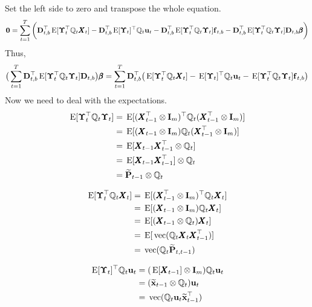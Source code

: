 \documentclass[]{article}
\def\bbeta{\pmb{\beta}}
\def\DD{\mbox{$\mathbf D$}}	\def\dd{\mbox{$\mathbf d$}}
\def\II{\mbox{$\mathbf I$}} \def\ii{\mbox{$\mathbf i$}}
\def\PP{\mbox{$\mathbf P$}}  \def\pp{\mbox{$\mathbf p$}}
\def\XX{\mbox{$\pmb{X}$}}	\def\xx{\mbox{$\pmb{x}$}}
\def\E{\,\textup{\textrm{E}}}
\def\vec{\,\textup{\textrm{vec}}}
\def\hatxtm{\widetilde{\mbox{$\mathbf x$}}_{t-1}}
\def\hatPtm{\widetilde{\PP}_{t-1}}
\def\hatPttm{\widetilde{\PP}_{t,t-1}}
\begin{document}
Set the left side to zero and transpose the whole equation. 
\begin{equation}
\mathbf{0}
 = \sum_{t=1}^T \bigg(
\DD_{t,b}^\top\E[\Bm_t^\top\Qm_t\XX_t]- \DD_{t,b}^\top\E[\Bm_t]^\top\Qm_t\uu_t
 - \DD_{t,b}^\top\E[\Bm_t^\top\Qm_t\Bm_t]\ff_{t,b}
 - \DD_{t,b}^\top\E[\Bm_t^\top\Qm_t\Bm_t]\DD_{t,b}\bbeta \bigg)
\end{equation}
Thus,
\begin{equation}
\big(\sum_{t=1}^T \DD_{t,b}^\top\E[\Bm_t^\top\Qm_t\Bm_t]\DD_{t,b} \big)\bbeta
 = \sum_{t=1}^T \DD_{t,b}^\top\big(
 \E[\Bm_t^\top\Qm_t\XX_t]
 - \E[\Bm_t]^\top\Qm_t\uu_t
  - \E[\Bm_t^\top\Qm_t\Bm_t]\ff_{t,b} \big)
\end{equation}
Now we need to deal with the expectations.
\begin{equation}\label{eq:B.expect1}
\begin{split}
\E[\Bm_t^\top\Qm_t\Bm_t]
&=\E[(\XX_{t-1}^\top \otimes \II_m)^\top\Qm_t(\XX_{t-1}^\top \otimes \II_m)]\\
&=\E[(\XX_{t-1} \otimes \II_m)\Qm_t(\XX_{t-1}^\top \otimes \II_m)]\\
&=\E[\XX_{t-1}\XX_{t-1}^\top \otimes \Qm_t]\\
&=\E[\XX_{t-1}\XX_{t-1}^\top] \otimes \Qm_t\\
&=\hatPtm \otimes \Qm_t
\end{split}
\end{equation}

\begin{equation}\label{eq:B.expect2}
\begin{split}
\E[\Bm_t^\top\Qm_t\XX_t]
&=\E[(\XX_{t-1}^\top \otimes \II_m)^\top\Qm_t\XX_t]\\
&=\E[(\XX_{t-1} \otimes \II_m)\Qm_t\XX_t]\\
&=\E[(\XX_{t-1} \otimes \Qm_t)\XX_t]\\
&=\E[\vec(\Qm_t\XX_t\XX_{t-1}^\top)]\\
&=\vec(\Qm_t\hatPttm)
\end{split}
\end{equation}

\begin{equation}\label{eq:B.expect3}
\begin{split}
\E[\Bm_t]^\top\Qm_t\uu_t&=(\E[\XX_{t-1}] \otimes \II_m)\Qm_t\uu_t \\
&= (\hatxtm \otimes \Qm_t)\uu_t \\
&= \vec(\Qm_t\uu_t\hatxtm^\top)
\end{split}
\end{equation}
\end{document}

